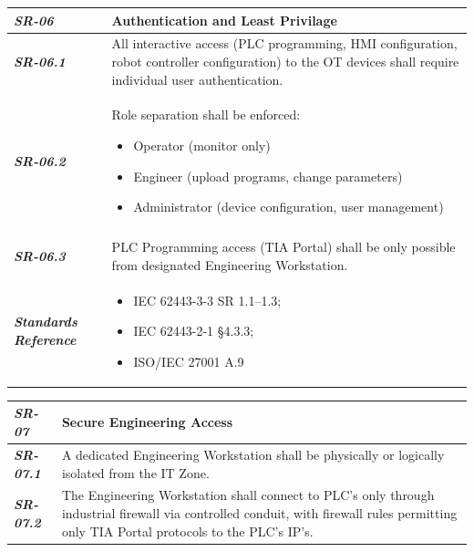 \begin{tabularx}{\textwidth}{>{\bfseries}p{2.5cm} X}
    \textit{SR-06} & \textbf{Authentication and Least Privilage} \vspace{0.5em}\\
\toprule
\textit{SR-06.1} &
    All interactive access (PLC programming, HMI configuration, robot controller configuration) to the OT devices shall require individual user authentication.
    \vspace{0.5em}
\\
\textit{SR-06.2} &
    Role separation shall be enforced:
    \begin{itemize}[label=-, noitemsep, topsep=0pt, leftmargin=*]
        \item Operator (monitor only)
        \item Engineer (upload programs, change parameters)
        \item Administrator (device configuration, user management)
    \end{itemize} \vspace{1em} \\ 
    \vspace{0.5em}
    \\
\textit{SR-06.3} &
    PLC Programming access (TIA Portal) shall be only possible from designated Engineering Workstation.
    \vspace{0.5em}
    \\
\midrule
    \textit{Standards Reference} &
\begin{itemize}[label=-, noitemsep, topsep=0pt, leftmargin=*]
    \item IEC 62443-3-3 SR 1.1–1.3; 
    \item IEC 62443-2-1 §4.3.3; 
    \item ISO/IEC 27001 A.9
\end{itemize} \vspace{1em} \\ 
\end{tabularx}
\vspace{2em}

\begin{tabularx}{\textwidth}{>{\bfseries}p{2.5cm} X}
    \textit{SR-07} & \textbf{Secure Engineering Access} \vspace{0.5em}\\
\toprule
\textit{SR-07.1} &
    A dedicated Engineering Workstation shall be physically or logically isolated from the IT Zone.
    \vspace{0.5em}
\\
\textit{SR-07.2} &
    The Engineering Workstation shall connect to PLC's only through industrial firewall via controlled conduit, with firewall rules permitting only TIA Portal protocols to the PLC's IP's. 
    \vspace{0.5em}
    \\
\end{tabularx}
\vspace{2em}

